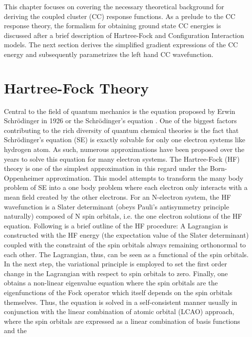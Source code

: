 This chapter focuses on covering the necessary theoretical background 
for deriving the coupled cluster (CC) response functions.
As a prelude to the CC response theory, the formalism for obtaining ground state CC energies 
is discussed after a brief description of Hartree-Fock and Configuration Interaction models.
The next section derives the simplified gradient expressions of the CC energy and subsequently 
parametrizes the left hand CC wavefunction.
\section{Hartree-Fock Theory}
Central to the field of quantum mechanics is the equation proposed by Erwin Schr\"odinger 
in 1926 or the Schr\"odinger's equation \cite{Schrodinger26}. One of the biggest factors 
contributing to the rich diversity of quantum chemical theories is the fact that Schr\"odinger's equation (SE)
is exactly solvable for only one electron systems like hydrogen atom. As such, numerous approximations
have been proposed over the years to solve this equation for many electron systems.
The Hartree-Fock (HF) theory\cite{SzaboOstlund} is one of the simplest approximation in this regard
under the Born-Oppenheimer approximation\cite{Born27}. %
This model attempts to transform the many body problem of SE into a one body problem where each electron
only interacts with a mean field created by the other electrons. For an N-electron system, the HF 
wavefunction is a Slater determinant (obeys Pauli's antisymmetry principle naturally) composed of N 
spin orbitals, i.e. the one electron solutions of the HF equation. Following is a brief outline
of the HF procedure: A Lagrangian is constructed with the HF energy (the expectation value of the 
Slater determinant) coupled with the constraint of the spin orbitals always remaining 
orthonormal to each other. The Lagrangian, thus, can be seen as a functional of the spin 
orbitals. In the next step, the variational principle is employed to set the first order 
change in the Lagrangian with respect to spin orbitals to zero. Finally, one obtains 
a non-linear eigenvalue equation where the spin orbitals are the eigenfunctions of 
the Fock operator which itself depends on the spin orbitals themselves. 
Thus, the equation is solved in a self-consistent manner usually in conjunction with 
the linear combination of atomic orbital (LCAO) approach, where the spin 
orbitals are expressed as a linear combination of basis functions and the 
